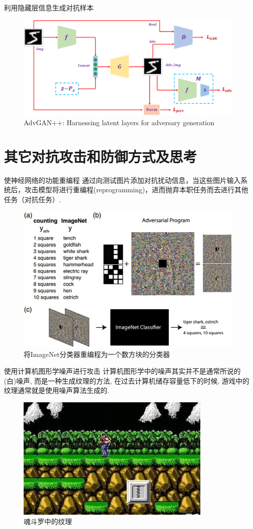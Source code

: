 \documentclass[UTF8, aspectratio=169, 10pt, t]{ctexbeamer}
\begin{document}
\begin{frame}{利用隐藏层信息生成对抗样本}
	\begin{figure}
		\centering
		\includegraphics[width=0.8\linewidth]{ggans/advganpp}
		\caption{AdvGAN++: Harnessing latent layers for adversary generation}
		\label{fig:advganpp}
	\end{figure}
	
\end{frame}

\section{其它对抗攻击和防御方式及思考}

\begin{frame}{使神经网络的功能重编程}
	通过向测试图片添加对抗扰动信息，当这些图片输入系统后，攻击模型将进行\alert{重编程(reprogramming)}，进而抛弃本职任务而去进行其他任务（对抗任务）. 
	\begin{figure}
		\centering
		\includegraphics[width=0.55\linewidth]{reprog}
		\caption{将ImageNet分类器重编程为一个数方块的分类器}
		\label{fig:reprog}
	\end{figure}
\end{frame}

\begin{frame}{使用计算机图形学噪声进行攻击}
	计算机图形学中的噪声其实并不是通常所说的(白)噪声, 而是一种生成纹理的方法, 在过去计算机储存容量低下的时候, 游戏中的纹理通常就是使用噪声算法生成的.

	\begin{figure}
		\centering
		\includegraphics[width=0.5\linewidth]{noise1}
		\caption{魂斗罗中的纹理}
		\label{fig:noise1}
	\end{figure}
	
\end{frame}
\end{document}
